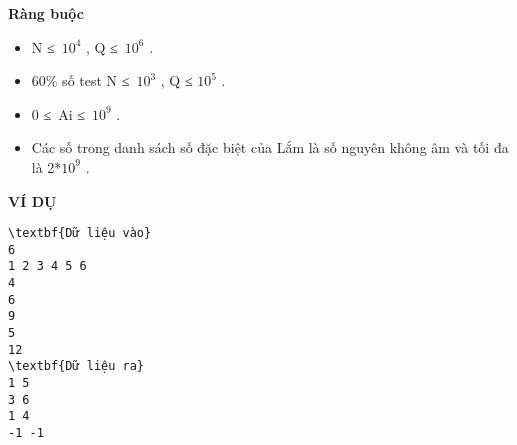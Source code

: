 \textbf{Ràng buộc}
\begin{itemize}
	\item N ≤ $10^{4}$ , Q ≤ $10^{6}$ .
	\item 60\% số test N ≤ $10^{3}$ , Q ≤ $10^{5}$ .
	\item 0 ≤ Ai ≤ $10^{9}$ .
	\item Các số trong danh sách số đặc biệt của Lắm là số nguyên không âm và tối đa là 2*$10^{9}$ .
\end{itemize}
\textbf{VÍ DỤ }
\begin{verbatim}
\textbf{Dữ liệu vào}
6
1 2 3 4 5 6
4
6
9
5
12
\textbf{Dữ liệu ra}
1 5
3 6
1 4
-1 -1
\end{verbatim}